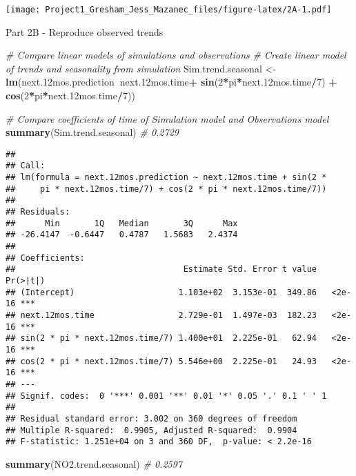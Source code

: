 \documentclass[
]{article}
\newenvironment{Shaded}{\begin{snugshade}}{\end{snugshade}}
\newcommand{\CommentTok}[1]{\textcolor[rgb]{0.56,0.35,0.01}{\textit{#1}}}
\newcommand{\DecValTok}[1]{\textcolor[rgb]{0.00,0.00,0.81}{#1}}
\newcommand{\FloatTok}[1]{\textcolor[rgb]{0.00,0.00,0.81}{#1}}
\newcommand{\KeywordTok}[1]{\textcolor[rgb]{0.13,0.29,0.53}{\textbf{#1}}}
\newcommand{\NormalTok}[1]{#1}
\newcommand{\OperatorTok}[1]{\textcolor[rgb]{0.81,0.36,0.00}{\textbf{#1}}}
\newcommand{\StringTok}[1]{\textcolor[rgb]{0.31,0.60,0.02}{#1}}
\begin{document}
\texttt{[image: Project1\_Gresham\_Jess\_Mazanec\_files/figure-latex/2A-1.pdf]}

Part 2B - Reproduce observed trends

\begin{Shaded}
\begin{Highlighting}[]
\CommentTok{# Compare linear models of simulations and observations}
\CommentTok{# Create linear model of trends and seasonality from simulation}
\NormalTok{Sim.trend.seasonal <-}\StringTok{ }\KeywordTok{lm}\NormalTok{(next}\FloatTok{.12}\NormalTok{mos.prediction}\OperatorTok{~}\NormalTok{next}\FloatTok{.12}\NormalTok{mos.time}\OperatorTok{+}\StringTok{ }\KeywordTok{sin}\NormalTok{(}\DecValTok{2}\OperatorTok{*}\NormalTok{pi}\OperatorTok{*}\NormalTok{next}\FloatTok{.12}\NormalTok{mos.time}\OperatorTok{/}\DecValTok{7}\NormalTok{) }\OperatorTok{+}\StringTok{ }\KeywordTok{cos}\NormalTok{(}\DecValTok{2}\OperatorTok{*}\NormalTok{pi}\OperatorTok{*}\NormalTok{next}\FloatTok{.12}\NormalTok{mos.time}\OperatorTok{/}\DecValTok{7}\NormalTok{))}

\CommentTok{# Compare coefficients of time of Simulation model and Observations model}
\KeywordTok{summary}\NormalTok{(Sim.trend.seasonal) }\CommentTok{# 0.2729}
\end{Highlighting}
\end{Shaded}

\begin{verbatim}
## 
## Call:
## lm(formula = next.12mos.prediction ~ next.12mos.time + sin(2 * 
##     pi * next.12mos.time/7) + cos(2 * pi * next.12mos.time/7))
## 
## Residuals:
##      Min       1Q   Median       3Q      Max 
## -26.4147  -0.6447   0.4787   1.5683   2.4374 
## 
## Coefficients:
##                                  Estimate Std. Error t value Pr(>|t|)    
## (Intercept)                     1.103e+02  3.153e-01  349.86   <2e-16 ***
## next.12mos.time                 2.729e-01  1.497e-03  182.23   <2e-16 ***
## sin(2 * pi * next.12mos.time/7) 1.400e+01  2.225e-01   62.94   <2e-16 ***
## cos(2 * pi * next.12mos.time/7) 5.546e+00  2.225e-01   24.93   <2e-16 ***
## ---
## Signif. codes:  0 '***' 0.001 '**' 0.01 '*' 0.05 '.' 0.1 ' ' 1
## 
## Residual standard error: 3.002 on 360 degrees of freedom
## Multiple R-squared:  0.9905, Adjusted R-squared:  0.9904 
## F-statistic: 1.251e+04 on 3 and 360 DF,  p-value: < 2.2e-16
\end{verbatim}

\begin{Shaded}
\begin{Highlighting}[]
\KeywordTok{summary}\NormalTok{(NO2.trend.seasonal) }\CommentTok{# 0.2597}
\end{Highlighting}
\end{Shaded}
\end{document}
